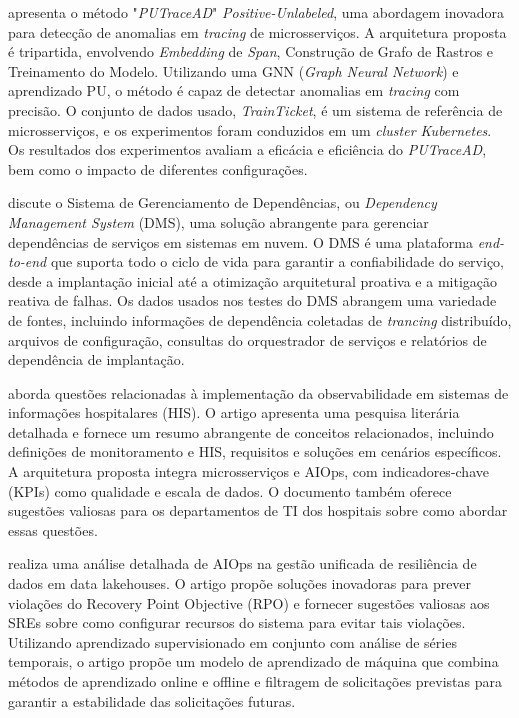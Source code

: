 \cite{9978983} apresenta o método "\textit{PUTraceAD}" \textit{Positive-Unlabeled}, uma abordagem inovadora para detecção de anomalias em \textit{tracing} de microsserviços. A arquitetura proposta é tripartida, envolvendo \textit{Embedding} de \textit{Span}, Construção de Grafo de Rastros e Treinamento do Modelo. Utilizando uma GNN (\textit{Graph Neural Network}) e aprendizado PU, o método é capaz de detectar anomalias em \textit{tracing} com precisão. O conjunto de dados usado, \textit{TrainTicket}, é um sistema de referência de microsserviços, e os experimentos foram conduzidos em um \textit{cluster Kubernetes}. Os resultados dos experimentos avaliam a eficácia e eficiência do \textit{PUTraceAD}, bem como o impacto de diferentes configurações.

\cite{9985105} discute o Sistema de Gerenciamento de Dependências, ou \textit{Dependency Management System} (DMS), uma solução abrangente para gerenciar dependências de serviços em sistemas em nuvem. O DMS é uma plataforma \textit{end-to-end} que suporta todo o ciclo de vida para garantir a confiabilidade do serviço, desde a implantação inicial até a otimização arquitetural proativa e a mitigação reativa de falhas. Os dados usados nos testes do DMS abrangem uma variedade de fontes, incluindo informações de dependência coletadas de \textit{trancing} distribuído, arquivos de configuração, consultas do orquestrador de serviços e relatórios de dependência de implantação.

\cite{10004053} aborda questões relacionadas à implementação da observabilidade em sistemas de informações hospitalares (HIS). O artigo apresenta uma pesquisa literária detalhada e fornece um resumo abrangente de conceitos relacionados, incluindo definições de monitoramento e HIS, requisitos e soluções em cenários específicos. A arquitetura proposta integra microsserviços e AIOps, com indicadores-chave (KPIs) como qualidade e escala de dados. O documento também oferece sugestões valiosas para os departamentos de TI dos hospitais sobre como abordar essas questões.

\cite{10020986} realiza uma análise detalhada de AIOps na gestão unificada de resiliência de dados em data lakehouses. O artigo propõe soluções inovadoras para prever violações do Recovery Point Objective (RPO) e fornecer sugestões valiosas aos SREs sobre como configurar recursos do sistema para evitar tais violações. Utilizando aprendizado supervisionado em conjunto com análise de séries temporais, o artigo propõe um modelo de aprendizado de máquina que combina métodos de aprendizado online e offline e filtragem de solicitações previstas para garantir a estabilidade das solicitações futuras.



